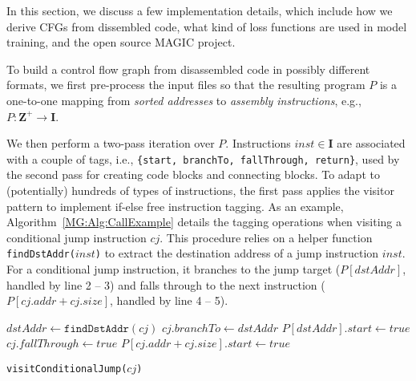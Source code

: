 \label{MG:Sec:Implement}

In this section, we discuss a few implementation details, which include how we derive CFGs from dissembled code, what kind of loss functions are used in model training, and the open source MAGIC project.

\label{MG:SubSec:BuildCfg}
To build a control flow graph from disassembled code in possibly different formats, we first pre-process the input files so that the resulting program $P$ is a one-to-one mapping from \textit{sorted addresses} to \textit{assembly instructions}, e.g., $P: \mathbf{Z}^+ \rightarrow \mathbf{I}$.

We then perform a two-pass iteration over $P$.
Instructions $inst \in \mathbf{I}$ are associated with a couple of tags,
i.e., \texttt{\{start, branchTo, fallThrough, return\}}, used by the second pass for creating code blocks and connecting blocks.
To adapt to (potentially) hundreds of types of instructions, the first pass applies the visitor pattern to implement if-else free instruction tagging.
As an example, Algorithm~\ref{MG:Alg:CallExample} details the tagging operations when visiting a conditional jump instruction $cj$.
This procedure relies on a helper function \texttt{findDstAddr($inst$)} to extract the destination address of a jump instruction $inst$.
For a conditional jump instruction,
it branches to the jump target ($P[dstAddr]$, handled by line 2 -- 3) and falls through to the next instruction ($P[cj.addr + cj.size]$, handled by line 4 -- 5).


\begin{algorithm}[t]
    \DontPrintSemicolon
    $dstAddr \gets \texttt{findDstAddr}(cj)$\;
    $cj.branchTo \gets dstAddr$\;
    $P[dstAddr].start \gets true$\;
    $cj.fallThrough \gets true$\;
    $P[cj.addr + cj.size].start \gets true$\;
    \caption{\texttt{visitConditionalJump($cj$)}}
    \label{MG:Alg:CallExample}
\end{algorithm}

